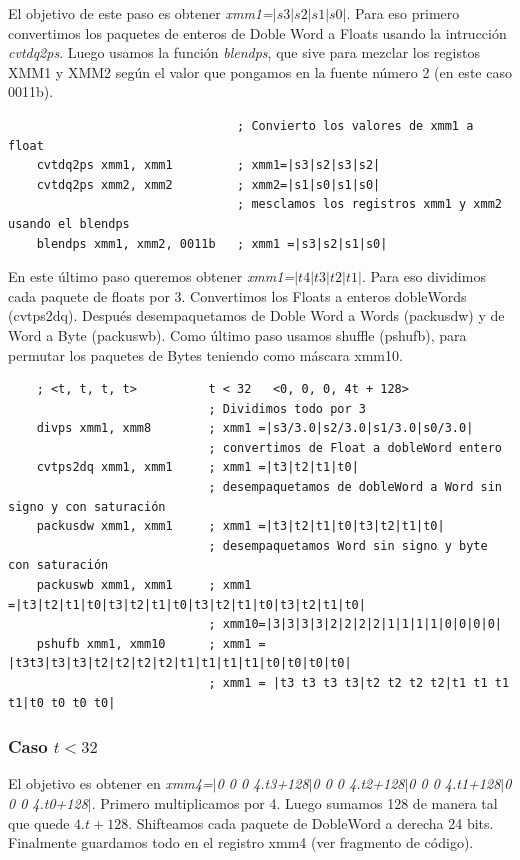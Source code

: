 El objetivo de este paso es obtener \emph{xmm1=$|s3|s2|s1|s0|$}. Para eso primero convertimos los paquetes de enteros de Doble Word a Floats usando la intrucción \emph{cvtdq2ps}. Luego usamos la función \emph{blendps}, que sive para mezclar los registos XMM1 y XMM2 según el valor que pongamos en la fuente número 2 (en este caso 0011b).

\begin{codesnippet}
\begin{verbatim}
                                ; Convierto los valores de xmm1 a float
    cvtdq2ps xmm1, xmm1         ; xmm1=|s3|s2|s3|s2|
    cvtdq2ps xmm2, xmm2         ; xmm2=|s1|s0|s1|s0|
                                ; mesclamos los registros xmm1 y xmm2 usando el blendps
    blendps xmm1, xmm2, 0011b   ; xmm1 =|s3|s2|s1|s0|
\end{verbatim}
\end{codesnippet}

En este último paso queremos obtener \emph{xmm1=$|t4|t3|t2|t1|$}. Para eso dividimos cada paquete de floats por 3. Convertimos los Floats a enteros dobleWords (cvtps2dq). Después desempaquetamos de Doble Word a Words (packusdw) y de Word a Byte (packuswb). Como último paso usamos shuffle (pshufb), para permutar los paquetes de Bytes teniendo como máscara xmm10. 

\begin{codesnippet}
\begin{verbatim}
    ; <t, t, t, t>          t < 32   <0, 0, 0, 4t + 128>
                            ; Dividimos todo por 3
    divps xmm1, xmm8        ; xmm1 =|s3/3.0|s2/3.0|s1/3.0|s0/3.0| 
                            ; convertimos de Float a dobleWord entero
    cvtps2dq xmm1, xmm1     ; xmm1 =|t3|t2|t1|t0|
                            ; desempaquetamos de dobleWord a Word sin signo y con saturación
    packusdw xmm1, xmm1     ; xmm1 =|t3|t2|t1|t0|t3|t2|t1|t0|
                            ; desempaquetamos Word sin signo y byte con saturación
    packuswb xmm1, xmm1     ; xmm1 =|t3|t2|t1|t0|t3|t2|t1|t0|t3|t2|t1|t0|t3|t2|t1|t0| 
                            ; xmm10=|3|3|3|3|2|2|2|2|1|1|1|1|0|0|0|0|
    pshufb xmm1, xmm10      ; xmm1 = |t3t3|t3|t3|t2|t2|t2|t2|t1|t1|t1|t1|t0|t0|t0|t0|
                            ; xmm1 = |t3 t3 t3 t3|t2 t2 t2 t2|t1 t1 t1 t1|t0 t0 t0 t0|
\end{verbatim}
\end{codesnippet}

\subsubsection*{Caso $t<32$}
El objetivo es obtener en \emph{xmm4=$|$0 0 0 4.t3+128$|$0 0 0 4.t2+128$|$0 0 0 4.t1+128$|$0 0 0 4.t0+128$|$}. Primero multiplicamos por 4. Luego sumamos 128 de manera tal que quede $4.t+128$. Shifteamos cada paquete de DobleWord a derecha 24 bits. Finalmente guardamos todo en el registro xmm4 (ver fragmento de código).

